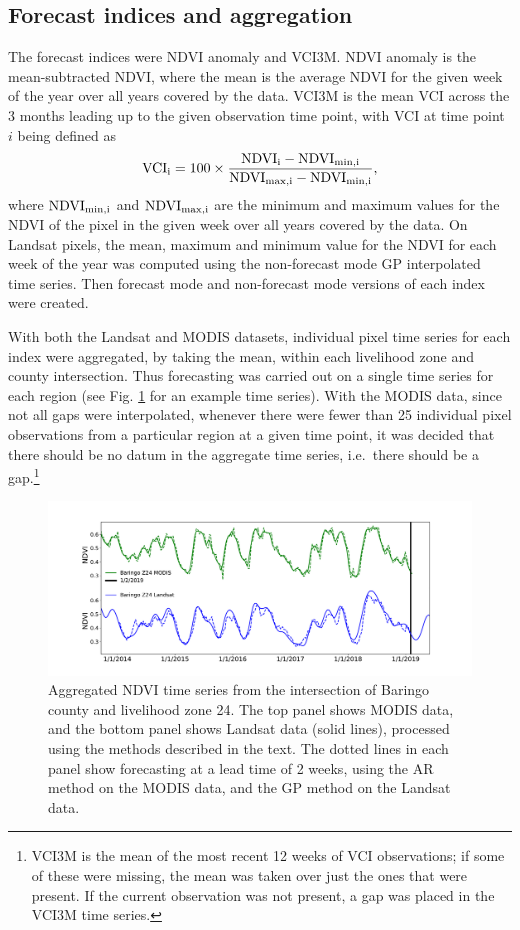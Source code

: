 \documentclass[review]{elsarticle}
\begin{document}
\subsection{Forecast indices and aggregation} \label{sec:vci}
The forecast indices were  NDVI anomaly and VCI3M. NDVI anomaly is the mean-subtracted NDVI, where the mean is the average NDVI for the given week of the year over all years covered by the data. VCI3M is the mean VCI across the 3 months leading up to the given observation time point, with VCI at time point $i$ being defined as
\begin{equation}
\rm{VCI}_i = 100 \times \frac{\rm{NDVI}_i - \rm{NDVI}_{min,i}}{ \rm{NDVI}_{max,i} - \rm{NDVI}_{min,i}},
\end{equation}
where $\rm{NDVI}_{min,i}$ and $\rm{NDVI}_{max,i}$ are the minimum and maximum values for the NDVI of the pixel in the given week over all years covered by the data. On Landsat pixels, the mean, maximum and minimum value for the NDVI for each week of the year
was computed using the non-forecast mode GP interpolated time series. Then forecast mode and non-forecast mode versions of each index were created. 

With both the Landsat and MODIS datasets, individual pixel time series for each index were aggregated, by taking the mean, within each livelihood zone and county intersection. Thus forecasting was carried out on a single time series for each region (see Fig. \ref{fig:ndvi_lk} for an example time series). With the MODIS data, since not all gaps were interpolated, whenever there were fewer than 25 individual pixel observations from a particular region at a given time point, it was decided that there should be no datum in the aggregate time series, i.e.~there should be a gap.\footnote{VCI3M is the mean of the most recent 12 weeks of VCI observations; if some of these were missing, the mean was taken over just the ones that were present. If the current observation was not present, a gap was placed in the VCI3M time series.} 



\begin{figure}
	\centering
	\includegraphics[trim = 50mm 0mm 0mm 0mm,width=14.5 cm]{figures/NDVI2.pdf} 
	\caption{Aggregated NDVI time series from the intersection of Baringo county and livelihood zone 24. The top panel shows MODIS data, and the bottom panel shows Landsat data (solid lines), processed using the methods described in the text. The dotted lines in each panel show forecasting at a lead time of 2 weeks, using the AR method on the MODIS data, and the GP method on the Landsat data.} \label{fig:ndvi_lk}
\end{figure}
\end{document}
